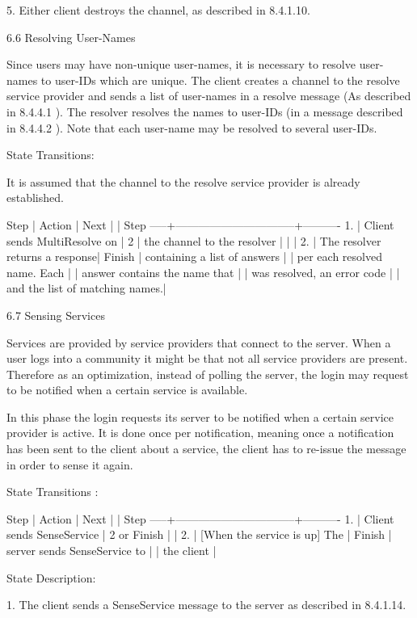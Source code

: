 \documentclass[titlepage,oneside]{book}
\begin{document}
5. Either client destroys the channel, as described in 8.4.1.10.

6.6 Resolving User-Names

Since users may have non-unique user-names, it is necessary to resolve
user-names to user-IDs which are unique. The client creates a channel
to the resolve service provider and sends a list of user-names in a
resolve message (As described in 8.4.4.1 ). The resolver
resolves the names to user-IDs (in a message described in
8.4.4.2 ). Note that each user-name may be resolved to
several user-IDs.

State Transitions:

It is assumed that the channel to the resolve service provider is
already established.

Step | Action                         |  Next
     |                                |  Step
-----+--------------------------------+----------
1.   | Client sends MultiResolve on   |  2
     | the channel to the resolver    |
     |                                |
2.   | The resolver returns a response|  Finish
     | containing a list of answers   |
     | per each resolved name. Each   |
     | answer contains the name that  |
     | was resolved, an error code    |
     | and the list of matching names.|

6.7 Sensing Services

Services are provided by service providers that connect to the server.
When a user logs into a community it might be that not all service
providers are present. Therefore as an optimization, instead of polling
the server, the login may request to be notified when a certain service
is available.

In this phase the login requests its server to be notified when a
certain service provider is active. It is done once per notification,
meaning once a notification has been sent to the client about a
service, the client has to re-issue the message in order to sense it
again.

State Transitions :

Step | Action                         |  Next
     |                                |  Step
-----+--------------------------------+----------
1.   | Client sends SenseService      |  2 or Finish
     |                                |
2.   | [When the service is up] The   |  Finish
     | server sends SenseService to   |
     | the client                     |

State Description:

1. The client sends a SenseService message to the server as described
in 8.4.1.14.
\end{document}
